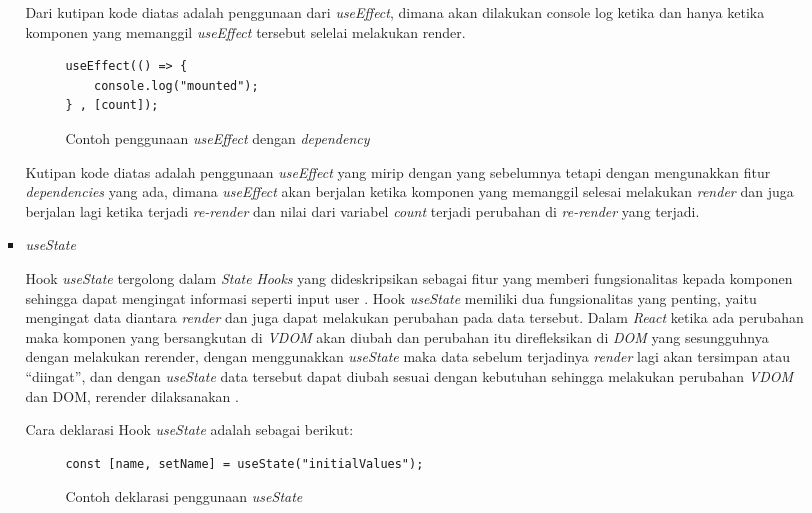 \documentclass[a4paper]{article}
\begin{document}
\begin{enumerate}[label=\alph*. ]
\begin{enumerate}
\begin{itemize}
                        Dari kutipan kode diatas adalah penggunaan dari \textit{useEffect}, dimana akan dilakukan console log ketika dan hanya ketika komponen yang memanggil \textit{useEffect} tersebut selelai melakukan render.

                        \begin{figure}[h]
                            \centering
                            \begin{lstlisting}[language=HTML]
useEffect(() => {
    console.log("mounted");
} , [count]);
                            \end{lstlisting}
                            \caption{Contoh penggunaan \textit{useEffect} dengan \textit{dependency}}
                        \end{figure}

                        Kutipan kode diatas adalah penggunaan \textit{useEffect} yang mirip dengan yang sebelumnya tetapi dengan mengunakkan fitur \textit{dependencies} yang ada, dimana \textit{useEffect} akan berjalan ketika komponen yang memanggil selesai melakukan \textit{render} dan juga berjalan lagi ketika terjadi \textit{re-render} dan nilai dari variabel \textit{count} terjadi perubahan di \textit{re-render} yang terjadi.

                        \item \textit{useState}

                        Hook \textit{useState} tergolong dalam \textit{State} \textit{Hooks} yang dideskripsikan sebagai fitur yang memberi fungsionalitas kepada komponen sehingga dapat mengingat informasi seperti input user \autocite{Banks_Porcello_2020}. Hook \textit{useState} memiliki dua fungsionalitas yang penting, yaitu mengingat data diantara \textit{render} dan juga dapat melakukan perubahan pada data tersebut. Dalam \textit{React} ketika ada perubahan maka komponen yang bersangkutan di \textit{VDOM} akan diubah dan perubahan itu direfleksikan di \textit{DOM} yang sesungguhnya dengan melakukan rerender, dengan menggunakkan \textit{useState} maka data sebelum terjadinya \textit{render} lagi akan tersimpan atau “diingat”, dan dengan \textit{useState} data tersebut dapat diubah sesuai dengan kebutuhan sehingga melakukan perubahan \textit{VDOM} dan DOM, rerender dilaksanakan \autocite{React_useState}.

                        Cara deklarasi Hook \textit{useState} adalah sebagai berikut:

                        \begin{figure}[h]
                            \centering
                            \begin{lstlisting}[language=HTML]
const [name, setName] = useState("initialValues");
                            \end{lstlisting}
                            \caption{Contoh deklarasi penggunaan \textit{useState}}
                        \end{figure}


\end{itemize}
\end{enumerate}
\end{enumerate}
\end{document}
